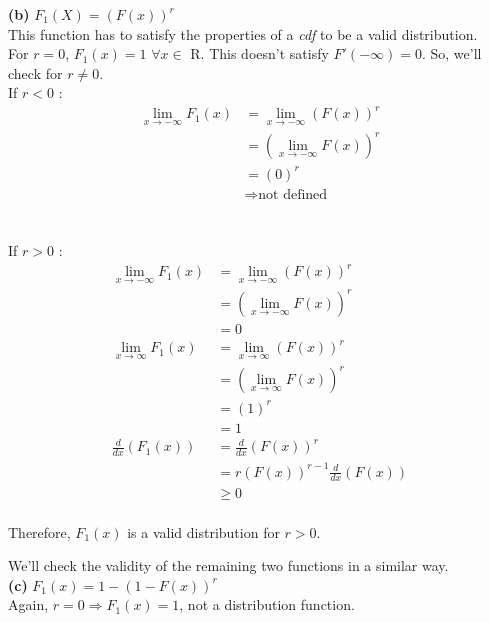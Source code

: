 \documentclass{article}
\begin{document}
\textbf{(b)} $F_1(X) = (F(x))^r$\\

This function has to satisfy the properties of a \textit{cdf} to be a valid distribution.\\
For $r=0$, $F_1(x)=1$ $\forall x \in$ R. This doesn't satisfy $F'(-\infty)= 0$. So, we'll check for $r \neq 0$.\\

If $r<0$ :\\
\begin{align*}
    \lim_{x\to -\infty} F_1(x) &= \lim_{x\to -\infty}(F(x))^r\\
    &= \left(\lim_{x\to -\infty} F(x)\right)^r\\
    &= (0)^r\\
    &\Rightarrow \text{not defined}
\end{align*}
\\
\\
If $r>0$ :\\
\begin{align*}
    \lim_{x\to -\infty} F_1(x) &= \lim_{x\to -\infty}(F(x))^r\\
    &= \left(\lim_{x\to -\infty} F(x)\right)^r\\
    &= 0\\
    \lim_{x\to \infty} F_1(x) &= \lim_{x\to \infty}(F(x))^r\\
    &= \left(\lim_{x\to \infty} F(x)\right)^r\\
    &= (1)^r\\
    &= 1\\
    \frac{d}{dx}(F_1(x)) &= \frac{d}{dx}(F(x))^r\\
    &= r(F(x))^{r-1}\frac{d}{dx}(F(x))\\
    &\geq 0\\
\end{align*}

Therefore, $F_1(x)$ is a valid distribution for $r > 0$.

We'll check the validity of the remaining two functions in a similar way.\\

\textbf{(c)} $F_1(x) = 1 - (1 - F(x))^r$\\

Again, $r=0 \Rightarrow F_1(x) = 1$, not a distribution function.\\
\end{document}
